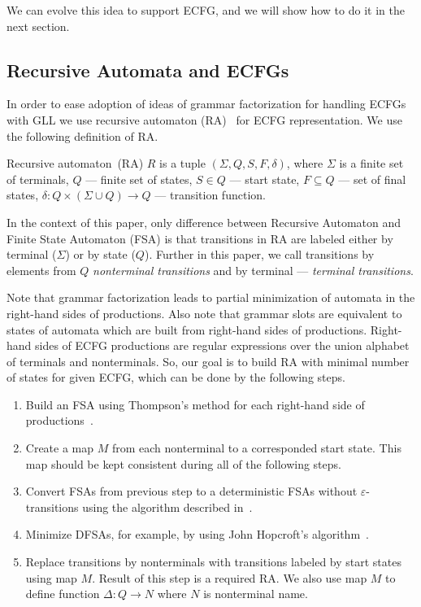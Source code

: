 \documentclass[runningheads,a4paper]{llncs}
\begin{document}
We can evolve this idea to support ECFG, and we will show how to do it in the next section.

\subsection{Recursive Automata and ECFGs}

In order to ease adoption of ideas of grammar factorization for handling ECFGs with GLL we use recursive automaton (RA)~\cite{tellier2006learning} for ECFG representation.
We use the following definition of RA.

\begin{mydef}
    Recursive automaton~(RA) $R$ is a tuple $(\Sigma, Q, S, F, \delta)$, where $\Sigma$ is a finite set of terminals, $Q$ --- finite set of states, $S \in Q$ --- start state, $F \subseteq Q$ --- set of final states, $\delta : Q \times (\Sigma \cup Q) \to Q$ --- transition function.
\end{mydef}

In the context of this paper, only difference between Recursive Automaton and Finite State Automaton (FSA) is that
transitions in RA are labeled either by terminal ($\Sigma$) or by state ($Q$).
Further in this paper, we call transitions by elements from $Q$ \textit{nonterminal transitions} and by terminal --- \textit{terminal transitions}.

Note that grammar factorization leads to partial minimization of automata in the right-hand sides of productions.
Also note that grammar slots are equivalent to states of automata which are built from right-hand sides of productions.
Right-hand sides of ECFG productions are regular expressions over the union alphabet of terminals and nonterminals.
So, our goal is to build RA with minimal number of states for given ECFG, which can be done by the following steps.
\begin{enumerate} 
\item Build an FSA using Thompson's method for each right-hand side of productions~\cite{Thompson:1968:PTR:363347.363387}.
\item Create a map $M$ from each nonterminal to a corresponded start state.
This map should be kept consistent during all of the following steps. 
\item Convert FSAs from previous step to a deterministic FSAs without $\varepsilon$-transitions using the algorithm described in~\cite{aho1974design}.
\item Minimize DFSAs, for example, by using John Hopcroft's algorithm~\cite{hopcroft1971n}.
\item Replace transitions by nonterminals with transitions labeled by start states using map $M$.
Result of this step is a required RA. We also use map $M$ to define function $\Delta : Q \to N$ where $N$ is nonterminal name.
\end{enumerate}
\end{document}
